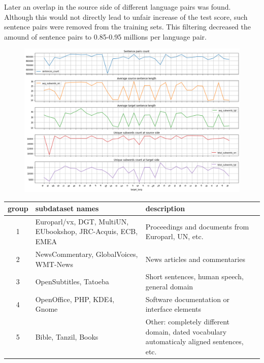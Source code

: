 Later an overlap in the source side of different language pairs was found.
Although this would not directly lead to unfair increase of the test score,
such sentence pairs were removed from the training sets.
This filtering decreased the amound of sentence pairs
to 0.85-0.95 millions per language pair.

\begin{figure}[h]
	\centering
	\includegraphics[width=0.9\columnwidth]{../img/train_set_statistics.png}
	\label{fig:language_statistics}
\end{figure}


\begin{table}[h!]
	\centering
	\begin{tabular}{c|p{}|p{}}
	\toprule
	     group & subdataset names  & description \\
	\midrule
	 1 &  Europarl/vx, DGT, MultiUN, EUbookshop, JRC-Acquis,
	      ECB, EMEA
	   &  Proceedings and documents from Europarl, UN, etc. \\
	 2 &  NewsCommentary, GlobalVoices, WMT-News 
	   &  News articles and commentaries \\
	 3 &  OpenSubtitles, Tatoeba
	   &  Short sentences, human speech, general domain \\
	 4 &  OpenOffice, PHP, KDE4, Gnome
	   &  Software documentation or interface elements \\
	 5 &  Bible, Tanzil, Books 
	   &  Other: completely different domain, dated vocabulary
	      automaticaly aligned sentences, etc. \\
	\bottomrule
	\end{tabular}

	\label{tab:subdatasets_groups}
\end{table}


